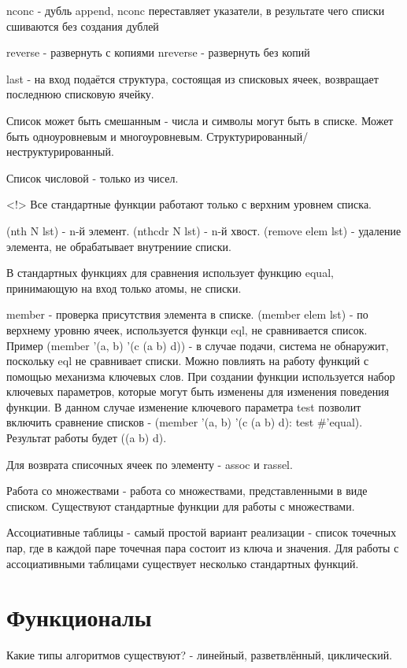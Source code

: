 nconc - дубль append, nconc переставляет указатели, в результате чего списки сшиваются без создания дублей

reverse - развернуть с копиями
nreverse - развернуть без копий

last - на вход подаётся структура, состоящая из списковых ячеек, возвращает последнюю списковую ячейку.

Список может быть смешанным - числа и символы могут быть в списке. Может быть одноуровневым и многоуровневым. Структурированный/неструктурированный.

Список числовой - только из чисел.

<!> Все стандартные функции работают только с верхним уровнем списка.

(nth N lst) - n-й элемент. (nthcdr N lst) - n-й хвост. (remove elem lst) - удаление элемента, не обрабатывает внутрениие списки. 

В стандартных функциях для сравнения использует функцию equal, принимающую на вход только атомы, не списки.

member - проверка присутствия элемента в списке. (member elem lst) - по верхнему уровню ячеек, используется функци eql, не сравнивается список. Пример (member '(a, b) '(c (a b) d)) - в случае подачи, система не обнаружит, поскольку eql не сравнивает списки. Можно повлиять на работу функций с помощью механизма ключевых слов. При создании функции используется набор ключевых параметров, которые могут быть изменены для изменения поведения функции. В данном случае изменение ключевого параметра test позволит включить сравнение списков - (member '(a, b) '(c (a b) d): test \#'equal). Результат работы будет ((a b) d).

Для возврата списочных ячеек по элементу - assoc и rassel.

Работа со множествами - работа со множествами, представленными в виде списком. Существуют стандартные функции для работы с множествами. 

Ассоциативные таблицы - самый простой вариант реализации - список точечных пар, где в каждой паре точечная пара состоит из ключа и значения. Для работы с ассоциативными таблицами существует несколько стандартных функций.

\section{Функционалы}

Какие типы алгоритмов существуют? - линейный, разветвлённый, циклический.

